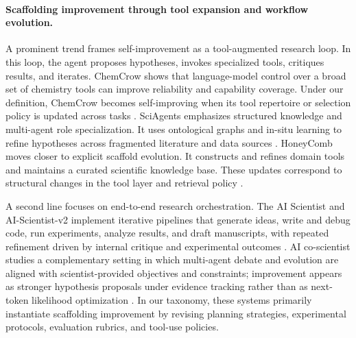 \documentclass{article}
\begin{document}
\paragraph{Scaffolding improvement through tool expansion and workflow evolution.}
A prominent trend frames self-improvement as a tool-augmented research loop. In this loop, the agent proposes hypotheses, invokes specialized tools, critiques results, and iterates. ChemCrow shows that language-model control over a broad set of chemistry tools can improve reliability and capability coverage. Under our definition, ChemCrow becomes self-improving when its tool repertoire or selection policy is updated across tasks \citep{m2024augmenting}. SciAgents emphasizes structured knowledge and multi-agent role specialization. It uses ontological graphs and in-situ learning to refine hypotheses across fragmented literature and data sources \citep{ghafarollahi2024sciagentsautomatingscientificdiscovery}. HoneyComb moves closer to explicit scaffold evolution. It constructs and refines domain tools and maintains a curated scientific knowledge base. These updates correspond to structural changes in the tool layer and retrieval policy \citep{zhang2024honeycomb}.


A second line focuses on end-to-end research orchestration. The AI Scientist and AI-Scientist-v2 implement iterative pipelines that generate ideas, write and debug code, run experiments, analyze results, and draft manuscripts, with repeated refinement driven by internal critique and experimental outcomes \citep{lu2024aiscientistfullyautomated, yamada2025aiscientistv2workshoplevelautomated}. AI co-scientist studies a complementary setting in which multi-agent debate and evolution are aligned with scientist-provided objectives and constraints; improvement appears as stronger hypothesis proposals under evidence tracking rather than as next-token likelihood optimization \citep{gottweis2025aicoscientist}. In our taxonomy, these systems primarily instantiate scaffolding improvement by revising planning strategies, experimental protocols, evaluation rubrics, and tool-use policies.
\end{document}
